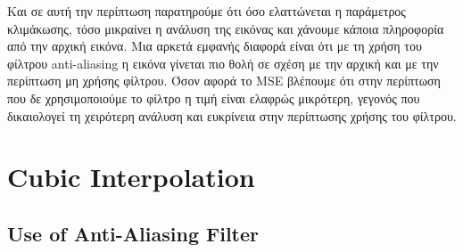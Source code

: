\documentclass{article}
\begin{document}
	\noindent
	Και σε αυτή την περίπτωση παρατηρούμε ότι όσο ελαττώνεται η παράμετρος κλιμάκωσης, τόσο μικραίνει η ανάλυση της εικόνας και χάνουμε κάποια πληροφορία από την αρχική εικόνα. Μια αρκετά εμφανής διαφορά είναι ότι με τη χρήση του φίλτρου anti-aliasing η εικόνα γίνεται πιο θολή σε σχέση με την αρχική και με την περίπτωση μη χρήσης φίλτρου. Όσον αφορά το MSE βλέπουμε ότι στην περίπτωση που δε χρησιμοποιούμε το φίλτρο η τιμή είναι ελαφρώς μικρότερη, γεγονός που δικαιολογεί τη χειρότερη ανάλυση και ευκρίνεια στην περίπτωσης χρήσης του φίλτρου.
\section*{Cubic Interpolation}
\subsection*{Use of Anti-Aliasing Filter}
\end{document}
